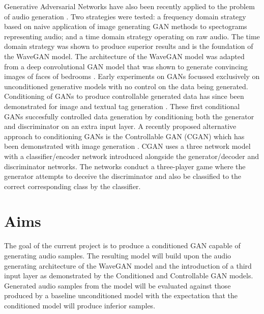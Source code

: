 \documentclass[a4paper, dvipsnames, titlepage]{article}
\begin{document}
\newline
\newline
Generative Adversarial Networks have also been recently applied to the problem of audio generation \cite{2018arXiv180204208D}.
Two strategies were tested: a frequency domain strategy based on naive application of image generating GAN methods to spectograms representing audio; and a time domain strategy operating on raw audio.
The time domain strategy was shown to produce superior results and is the foundation of the WaveGAN model.
The architecture of the WaveGAN model was adapted from a deep convolutional GAN model that was shown to generate convincing images of faces of bedrooms \cite{2015arXiv151106434R}.
\newline
\newline
Early experiments on GANs focussed exclusively on unconditioned generative models with no control on the data being generated.
Conditioning of GANs to produce controllable generated data has since been demonstrated for image and textual tag generation \cite{2014arXiv1411.1784M}.
These first conditional GANs succesfully controlled data generation by conditioning both the generator and discriminator on an extra input layer.
\newline
\newline
A recently proposed alternative approach to conditioning GANs is the Controllable GAN (CGAN) which has been demonstrated with image generation \cite{2017arXiv170800598L}.
CGAN uses a three network model with a classifier/encoder network introduced alongside the generator/decoder and discriminator networks.
The networks conduct a three-player game where the generator attempts to deceive the discriminator and also be classified to the correct corresponding class by the classifier.

\newpage

\section{Aims}

The goal of the current project is to produce a conditioned GAN capable of generating audio samples.
The resulting model will build upon the audio generating architecture of the WaveGAN model and the introduction of a third input layer as demonstrated by the Conditioned and Controllable GAN models.
Generated audio samples from the model will be evaluated against those produced by a baseline unconditioned model with the expectation that the conditioned model will produce inferior samples.
\end{document}
